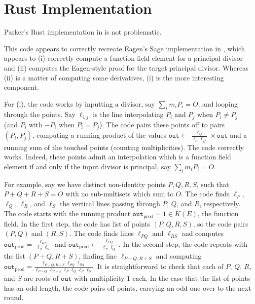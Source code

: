 \documentclass{article}
\theoremstyle{definition}
\newcommand{\6}{\mathbf}
\newcommand{\7}{\mathcal}
\begin{document}
\section{Rust Implementation}

Parker's Rust implementation in \cite{KayabaG24} is not problematic.

This code appears to correctly recreate Eagen's Sage implementation in \cite{Eagen22}, which appears to (i) correctly compute a function field element for a principal divisor and (ii) computes the Eagen-style proof for the target principal divisor.  Whereas (ii) is a matter of computing some derivatives, (i) is the more interesting component.

For (i), the code works by inputting a divisor, say $\sum_i m_i P_i = O$, and looping through the points. Say $\ell_{i,j}$ is the line interpolating $P_i$ and $P_j$ when $P_i \neq P_j$ (and $P_i$ with $-P_i$ when $P_i = P_j$). The code pairs these points off to pairs $(P_i, P_j)$, computing a running product of the values $\texttt{out} \leftarrow \frac{\ell_{ij}}{\ell_{ii}\ell_{jj}} \times \texttt{out}$ and a running sum of the touched points (counting multiplicities).
The code correctly works. Indeed, these points admit an interpolation which is a function field element if and only if the input divisor is principal, say $\sum_i m_i P_i = O$. 

For example, say we have distinct non-identity points $P, Q, R, S$, such that $P + Q + R  + S= O$ with no sub-multisets which sum to $O$. The code finds $\ell_P$, $\ell_Q$, $\ell_R$, and $\ell_S$ the vertical lines passing through $P$, $Q$, and $R$, respectively. The code starts with the running product $\texttt{out}_{\text{prod}}=1 \in K(E)$, the function field.
In the first step, the code has list of points $(P, Q, R, S)$, so the code pairs $(P, Q)$ and $(R, S)$. The code finds lines $\ell_{PQ}$ and $\ell_{RS}$ and computes $\texttt{out}_{\text{prod}} = \frac{\ell_{RS}}{\ell_R\ell_S}$ and $\texttt{out} _{\text{prod}} \leftarrow \frac{\ell_{PQ}}{\ell_P\ell_Q}$. In the second step, the code repeats with the list $(P+Q, R+S)$, finding line $\ell_{P+Q,R+S}$ and computing $\texttt{out} _{\text{prod}} = \frac{\ell_{P+Q,R+S}\ell_{PQ}\ell_{RS}}{\ell_{P+Q}\ell_{R+S}\ell_{P}\ell_{Q}\ell_{R}\ell_{S}}$. It is straightforward to check that each of $P$, $Q$, $R$, and $S$ are roots of $\texttt{out}$ with multiplicity $1$ each.
In the case that the list of points has an odd length, the code pairs off points, carrying an odd one over to the next round. 
\end{document}
